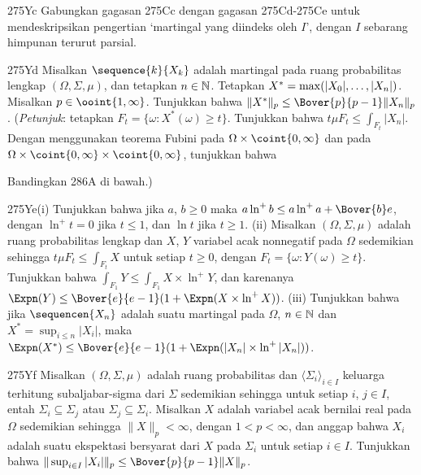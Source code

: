 {\spheader 275Yc Gabungkan gagasan 275Cc dengan gagasan 275Cd-275Ce untuk
mendeskripsikan pengertian `martingal yang diindeks oleh $I$', dengan $I$
sebarang himpunan terurut parsial.

\spheader 275Yd
Misalkan $\sequence{k}{X_k}$ adalah martingal pada ruang probabilitas lengkap
$(\Omega,\Sigma,\mu)$, dan tetapkan $n\in\Bbb N$. Tetapkan
$X^*=\max(|X_0|,\ldots,\discretionary{}{}{}|X_n|)$. Misalkan
$p\in\ooint{1,\infty}$. Tunjukkan bahwa
$\|X^*\|_p\le\Bover{p}{p-1}\|X_n\|_p$. ({\it Petunjuk\/}: tetapkan
$F_t=\{\omega:X^*(\omega)\ge t\}$. Tunjukkan bahwa
$t\mu F_t\le\int_{F_t}|X_n|$. Dengan menggunakan teorema Fubini pada
$\Omega\times\coint{0,\infty}$ dan pada
$\Omega\times\coint{0,\infty}\times\coint{0,\infty}$, tunjukkan bahwa




\noindent Bandingkan 286A di bawah.)

\spheader 275Ye(i)
Tunjukkan bahwa jika $a$, $b\ge 0$ maka
$a\ln^+b\le a\ln^+a+\Bover{b}e$, dengan $\ln^+t=0$ jika $t\le 1$,
dan $\ln t$ jika $t\ge 1$.
(ii) Misalkan $(\Omega,\Sigma,\mu)$ adalah ruang probabilitas lengkap dan
$X$, $Y$ variabel acak nonnegatif pada $\Omega$ sedemikian sehingga
$t\mu F_t\le\int_{F_t}X$ untuk setiap $t\ge 0$, dengan
$F_t=\{\omega:Y(\omega)\ge t\}$. Tunjukkan bahwa
$\int_{F_1}Y\le\int_{F_1}X\times\ln^+Y$, dan karenanya
$\Expn(Y)\le\Bover{e}{e-1}(1+\Expn(X\times\ln^+X))$. (iii) Tunjukkan bahwa
jika $\sequencen{X_n}$ adalah suatu martingal pada $\Omega$, $n\in\Bbb N$
dan $X^*=\sup_{i\le n}|X_i|$, maka
$\Expn(X^*)\le\Bover{e}{e-1}(1+\Expn(|X_n|\times\ln^+|X_n|))$.

\spheader 275Yf Misalkan $(\Omega,\Sigma,\mu)$ adalah ruang probabilitas
dan $\langle\Sigma_i\rangle_{i\in I}$ keluarga terhitung subaljabar-sigma
dari $\Sigma$ sedemikian sehingga untuk setiap $i$, $j\in I$, entah
$\Sigma_i\subseteq\Sigma_j$ atau $\Sigma_j\subseteq\Sigma_i$. Misalkan $X$
adalah variabel acak bernilai real pada $\Omega$ sedemikian sehingga
$\|X\|_p<\infty$, dengan $1<p<\infty$, dan anggap bahwa $X_i$ adalah suatu
ekspektasi bersyarat dari $X$ pada $\Sigma_i$ untuk setiap $i\in I$.
Tunjukkan bahwa
$\|\sup_{i\in I}|X_i|\|_p\le\Bover{p}{p-1}\|X\|_p$.

}

